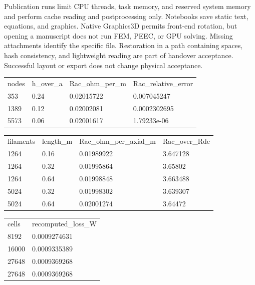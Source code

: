 \documentclass[journal,10pt]{IEEEtran}
\begin{document}
Publication runs limit CPU threads, task memory, and reserved system memory and perform cache reading and postprocessing only. Notebooks save static text, equations, and graphics. Native Graphics3D permits front-end rotation, but opening a manuscript does not run FEM, PEEC, or GPU solving. Missing attachments identify the specific file. Restoration in a path containing spaces, hash consistency, and lightweight reading are part of handover acceptance. Successful layout or export does not change physical acceptance.


\begin{table}[!htbp]
\par
\begingroup\footnotesize\begin{tabular}{p{40.45mm}|p{40.45mm}|p{40.45mm}|p{40.45mm}}
\toprule
nodes & h\_\allowbreak over\_\allowbreak a & Rac\_\allowbreak ohm\_\allowbreak per\_\allowbreak m & Rac\_\allowbreak relative\_\allowbreak error\\
353 & 0.24 & 0.02015722 & 0.007045247\\
1389 & 0.12 & 0.02002081 & 0.0002302695\\
5573 & 0.06 & 0.02001617 & 1.79233e-06\\
\bottomrule\end{tabular}\endgroup
\end{table}
\begin{table}[!htbp]
\par
\begingroup\footnotesize\begin{tabular}{p{40.45mm}|p{40.45mm}|p{40.45mm}|p{40.45mm}}
\toprule
filaments & length\_\allowbreak m & Rac\_\allowbreak ohm\_\allowbreak per\_\allowbreak axial\_\allowbreak m & Rac\_\allowbreak over\_\allowbreak Rdc\\
1264 & 0.16 & 0.01989922 & 3.647128\\
1264 & 0.32 & 0.01995864 & 3.65802\\
1264 & 0.64 & 0.01998848 & 3.663488\\
5024 & 0.32 & 0.01998302 & 3.639307\\
5024 & 0.64 & 0.02001274 & 3.64472\\
\bottomrule\end{tabular}\endgroup
\end{table}
\begin{table}[!htbp]
\par
\begingroup\footnotesize\begin{tabular}{p{84.9mm}|p{84.9mm}}
\toprule
cells & recomputed\_\allowbreak loss\_\allowbreak W\\
8192 & 0.0009274631\\
16000 & 0.0009335389\\
27648 & 0.0009369268\\
27648 & 0.0009369268\\
\bottomrule\end{tabular}\endgroup
\end{table}
\end{document}
